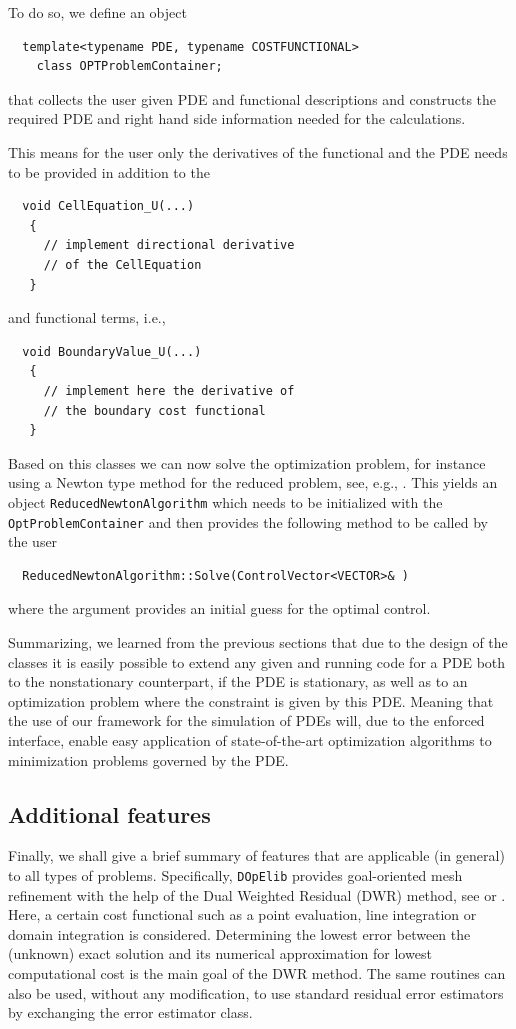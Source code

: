 \documentclass[smallextended]{svjour3}       %
\numberwithin{equation}{section}
\newcommand{\dope}{\texttt{DOpElib}}
\begin{document}
To do so, we define an object 
\begin{lstlisting} 
  template<typename PDE, typename COSTFUNCTIONAL>
    class OPTProblemContainer;
\end{lstlisting}
that collects the user given PDE and functional descriptions and constructs the 
required PDE and right hand side information needed for the calculations.

This means for the user only the derivatives of the functional and the PDE 
needs to be provided in addition to the 
\begin{lstlisting} 
  void CellEquation_U(...)
   {
     // implement directional derivative 
     // of the CellEquation
   }
\end{lstlisting}
and functional terms, i.e.,     
\begin{lstlisting} 
  void BoundaryValue_U(...)
   {
     // implement here the derivative of 
     // the boundary cost functional
   }
\end{lstlisting}

Based on this classes we can now solve the optimization problem, for instance using 
a Newton type method for the reduced problem, see, e.g., \cite{NoWr00}. This yields 
an object \texttt{ReducedNewtonAlgorithm} which needs to be initialized 
with the \texttt{OptProblemContainer} and then provides 
the following method to be called by the user
\begin{lstlisting}
  ReducedNewtonAlgorithm::Solve(ControlVector<VECTOR>& )
\end{lstlisting}
where the argument provides an initial guess for the optimal control.

Summarizing, we learned from the previous sections 
that 
due to the design of the classes it is easily possible to extend any given 
and running code for a PDE both to the nonstationary counterpart, if the PDE is 
stationary, as well as to an optimization problem where the constraint is 
given by this PDE. Meaning that the use of our framework for the simulation of 
PDEs will, due to the enforced interface, enable easy application of state-of-the-art 
optimization algorithms to minimization problems governed by the PDE.


\subsection{Additional features}
Finally, we shall give a brief summary of features 
that are applicable (in general) to all types of problems. Specifically,
\dope{} provides goal-oriented mesh refinement with the help of the 
Dual Weighted Residual (DWR) method, see \cite{BeRa96} or \cite{BR03}. Here, a certain 
cost functional such as a point evaluation, line integration or domain
integration is considered. Determining the lowest error between the 
(unknown) exact solution and its numerical approximation for lowest computational
cost is the main goal of the DWR method. The same routines 
can also be used, without any modification, to use standard residual error estimators by exchanging the 
error estimator class.
\end{document}
